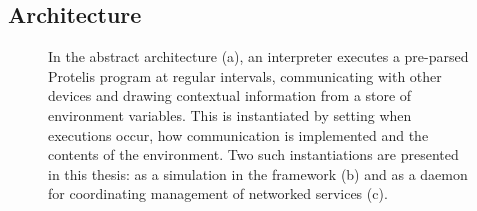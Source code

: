 \documentclass[12pt,a4paper,twoside,openright]{book}
\begin{document}
\subsection{Architecture}
\label{protelis-architecture}
\begin{figure}
\centering
{}
\caption[Abstract \protelis{} architecture]{In the abstract \protelis{} architecture (a), an interpreter executes a pre-parsed Protelis program at regular intervals, communicating with other devices and drawing contextual information from a store of environment variables.
%
This is instantiated by setting when executions occur, how communication is implemented and the contents of the environment.
%
Two such instantiations are presented in this thesis: as a simulation in the \alchemist{} framework (b) and as a daemon for coordinating management of networked services (c).}
\label{img:protelis-architecture}
\end{figure}
\end{document}
